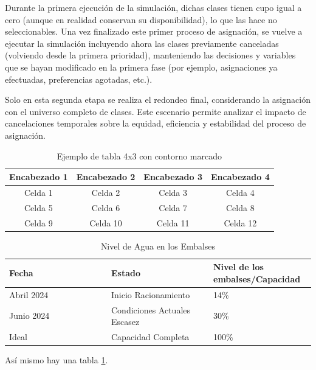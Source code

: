 \documentclass{article}
\begin{document}
Durante la primera ejecución de la simulación, dichas clases tienen cupo igual a cero 
(aunque en realidad conservan su disponibilidad), lo que las hace no seleccionables. Una vez 
finalizado este primer proceso de asignación, se vuelve a ejecutar la simulación 
incluyendo ahora las clases previamente canceladas (volviendo desde la primera prioridad), 
manteniendo las decisiones y variables 
que se hayan modificado en la primera fase (por ejemplo, asignaciones ya efectuadas, 
preferencias agotadas, etc.).

Solo en esta segunda etapa se realiza el redondeo final, considerando la asignación con el 
universo completo de clases. Este escenario permite analizar el impacto de cancelaciones 
temporales sobre la equidad, eficiencia y estabilidad del proceso de asignación.



\renewcommand{\tablename}{Tabla}
\begin{table}[htbp]
  \centering
  \caption{Ejemplo de tabla 4x3 con contorno marcado \label{tab:Prueba}}
  \begin{tabular}{|c|c|c|c|} %
    \hline
    Encabezado 1 & Encabezado 2 & Encabezado 3 & Encabezado 4 \\
    \hline
    Celda 1 & Celda 2 & Celda 3 & Celda 4 \\
    \hline
    Celda 5 & Celda 6 & Celda 7 & Celda 8 \\
    \hline
    Celda 9 & Celda 10 & Celda 11 & Celda 12 \\
    \hline
  \end{tabular}
\end{table}

\begin{table}[H]
\centering
\caption{Nivel de Agua en los Embalses}
\label{tab:NivelAgua}
\begin{tabular}{|p{0.333\linewidth}|p{0.333\linewidth}|p{0.333\linewidth}|}
\hline
\textbf{Fecha} & \textbf{Estado} & \textbf{Nivel de los embalses/Capacidad} \\
\hline
Abril 2024 & Inicio Racionamiento & 14\% \\
\hline
Junio 2024 & Condiciones Actuales Escasez & 30\% \\
\hline
Ideal & Capacidad Completa & 100\% \\
\hline
\end{tabular}
\end{table}

Así mismo hay una tabla \ref{tab:Prueba}.
\end{document}
